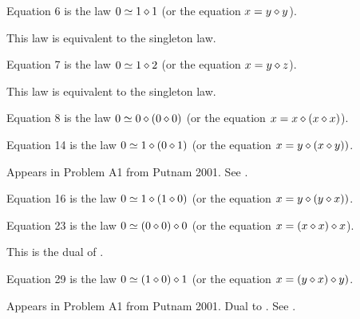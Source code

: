 \begin{definition}[Equation 6]\label{eq6}\leanok{}  Equation 6 is the law $0 \simeq 1 \diamond 1$ (or the equation $x = y \diamond y$).
\end{definition}

This law is equivalent to the singleton law.

\begin{definition}[Equation 7]\label{eq7}\leanok{}  Equation 7 is the law $0 \simeq 1 \diamond 2$ (or the equation $x = y \diamond z$).
\end{definition}

This law is equivalent to the singleton law.

\begin{definition}[Equation 8]\label{eq8}\leanok{}  Equation 8 is the law $0 \simeq 0 \diamond (0 \diamond 0)$ (or the equation $x = x \diamond (x \diamond x)$).
\end{definition}

\begin{definition}[Equation 14]\label{eq14}\leanok{}  Equation 14 is the law $0 \simeq  1 \diamond (0 \diamond 1)$ (or the equation $x = y \diamond (x \diamond y))$.
\end{definition}

Appears in Problem A1 from Putnam 2001.  See .

\begin{definition}[Equation 16]\label{eq16}\leanok{}  Equation 16 is the law $0 \simeq  1 \diamond (1 \diamond 0)$ (or the equation $x = y \diamond (y \diamond x))$.
\end{definition}

\begin{definition}[Equation 23]\label{eq23}\leanok{}  Equation 23 is the law $0 \simeq  (0 \diamond 0) \diamond 0$ (or the equation $x = (x \diamond x) \diamond x$).
\end{definition}

This is the dual of .

\begin{definition}[Equation 29]\label{eq29}\leanok{}  Equation 29 is the law $0 \simeq  (1 \diamond 0) \diamond 1$ (or the equation $x = (y \diamond x) \diamond y)$.
\end{definition}

Appears in Problem A1 from Putnam 2001.  Dual to .  See .

